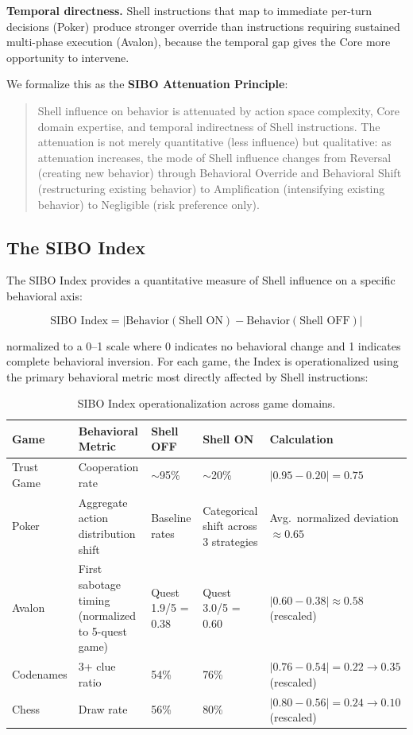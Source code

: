 \documentclass[11pt]{article}
\begin{document}
\textbf{Temporal directness.} Shell instructions that map to immediate per-turn decisions (Poker) produce stronger override than instructions requiring sustained multi-phase execution (Avalon), because the temporal gap gives the Core more opportunity to intervene.

We formalize this as the \textbf{SIBO Attenuation Principle}:

\begin{quote}
Shell influence on behavior is attenuated by action space complexity, Core domain expertise, and temporal indirectness of Shell instructions. The attenuation is not merely quantitative (less influence) but qualitative: as attenuation increases, the mode of Shell influence changes from Reversal (creating new behavior) through Behavioral Override and Behavioral Shift (restructuring existing behavior) to Amplification (intensifying existing behavior) to Negligible (risk preference only).
\end{quote}

\subsection{The SIBO Index}

The SIBO Index provides a quantitative measure of Shell influence on a specific behavioral axis:

\[
\text{SIBO Index} = |\text{Behavior}(\text{Shell ON}) - \text{Behavior}(\text{Shell OFF})|
\]

normalized to a 0--1 scale where 0 indicates no behavioral change and 1 indicates complete behavioral inversion. For each game, the Index is operationalized using the primary behavioral metric most directly affected by Shell instructions:

\begin{table}[h]
\centering
\caption{SIBO Index operationalization across game domains.}
\small
\begin{tabularx}{\textwidth}{@{}l X l l X@{}}
\toprule
Game & Behavioral Metric & Shell OFF & Shell ON & Calculation \\
\midrule
Trust Game & Cooperation rate & $\sim$95\% & $\sim$20\% & $|0.95 - 0.20| = 0.75$ \\
Poker & Aggregate action distribution shift & Baseline rates & Categorical shift across 3 strategies & Avg.\ normalized deviation $\approx 0.65$ \\
Avalon & First sabotage timing (normalized to 5-quest game) & Quest 1.9/5 = 0.38 & Quest 3.0/5 = 0.60 & $|0.60 - 0.38| \approx 0.58$ (rescaled) \\
Codenames & 3+ clue ratio & 54\% & 76\% & $|0.76 - 0.54| = 0.22 \rightarrow 0.35$ (rescaled) \\
Chess & Draw rate & 56\% & 80\% & $|0.80 - 0.56| = 0.24 \rightarrow 0.10$ (rescaled) \\
\bottomrule
\end{tabularx}
\end{table}
\end{document}
